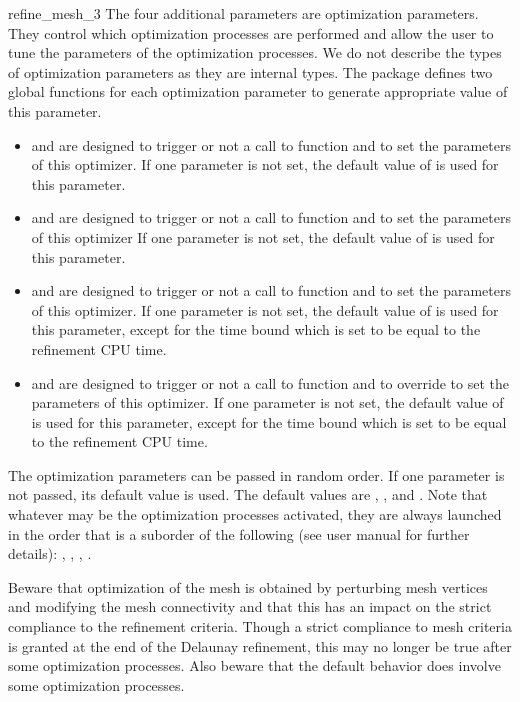 \begin{ccRefFunction}{refine_mesh_3}
The four additional parameters are optimization parameters.
They control which optimization processes are performed
and allow the user to tune the parameters of the optimization processes.
We do not describe  the types of optimization parameters  as they are
internal types. The package defines two global
functions for each optimization parameter
 to generate appropriate value of this parameter.

\begin{itemize}
\item {} and  are designed to
  trigger or not a call to  function and to set the
  parameters of this optimizer. If one parameter is not set, the default value of
   is used for this parameter.
\item {} and  are designed to
  trigger or not a call to  function and 
to set the  parameters of this optimizer
 If one parameter is not set, the default value of
   is used for this parameter.
\item {} and  are designed  to
  trigger or not a call to  function and 
to set the  parameters of this optimizer. If one parameter is not set, the default value of
   is used for this parameter, except for the time bound which is set to be
  equal to the refinement CPU time.
\item {} and  are designed to
  trigger or not a call to  function and  to override to set the
  parameters of this optimizer. If one parameter is not set, the default value of
   is used for this parameter, except for the time bound which is set to be
  equal to the refinement CPU time.
\end{itemize}


The optimization parameters can be passed in random order. If one parameter
is not passed, its default value is used. The default values are
, ,  and .
Note that whatever may be the optimization processes activated,
they are always launched in the order that is a suborder 
of the following (see user manual for further details):
, , , .

Beware that optimization of the mesh is obtained
 by perturbing mesh vertices and modifying the mesh connectivity
 and that this  has an impact
on the strict compliance to the refinement criteria. 
Though a strict compliance to mesh criteria
is granted at the end of the Delaunay refinement, this may  no longer be true after
some optimization processes. Also beware that the default behavior does involve some
optimization processes.



\end{ccRefFunction}
